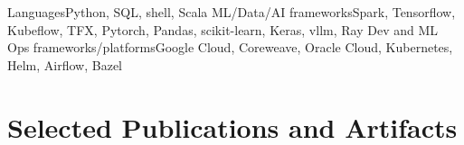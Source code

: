 \documentclass[print]{ag-cv} %
\begin{document}
\begin{skills}
  {Languages}{Python, SQL, shell, Scala}
  {ML/Data/AI frameworks}{Spark, Tensorflow, Kubeflow, TFX, Pytorch, Pandas, scikit-learn, Keras, vllm, Ray}
  {Dev and ML Ops frameworks/platforms}{Google Cloud, Coreweave, Oracle Cloud, Kubernetes, Helm, Airflow, Bazel}
\end{skills}


\section*{Selected Publications and Artifacts}
  
  \newrefcontext[sorting=chronological]
  \nocite{network_induced_memory_contention,
    skullstrip,do_more_with_twitter_data} \leavevmode\printbibliography[heading=none,keyword={selected}] 
    
\end{document}
